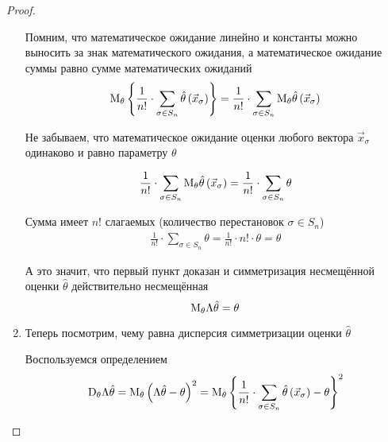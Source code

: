 \begin{proof}
\begin{enumerate}
            Помним, что математическое ожидание линейно и
            константы можно выносить за знак математического ожидания,
            а математическое ожидание суммы равно сумме математических ожиданий
            \begin{align*}
                \mathrm{M}_{\theta} \left\{\frac{1}{n!}\cdot\sum_{\sigma\in S_n}
                    \hat{\theta}\left(\vec{x}_\sigma\right)\right\}
                    =\frac{1}{n!}\cdot\sum_{\sigma\in S_n}
                        \mathrm{M}_{\theta} \hat{\theta}\left(\vec{x}_\sigma\right)
            \end{align*}

            Не забываем, что математическое ожидание оценки
            любого вектора $\vec{x}_\sigma$ одинаково и равно параметру $\theta$

            \begin{align*}
                \frac{1}{n!}\cdot\sum_{\sigma\in S_n}
                    \mathrm{M}_{\theta} \hat{\theta}\left(\vec{x}_\sigma\right)
                    =\frac{1}{n!}\cdot\sum_{\sigma\in S_n}\theta
            \end{align*}

            Сумма имеет $n!$ слагаемых (количество перестановок $\sigma\in S_n$)
            \begin{align*}
                \frac{1}{n!}\cdot\sum_{\sigma\in S_n}\theta
                    =\frac{1}{n!}\cdot n!\cdot\theta
                    =\theta
            \end{align*}

            А это значит, что первый пункт доказан и симметризация
            несмещённой оценки $\hat{\theta}$ действительно несмещённая
            $$\mathrm{M}_{\theta} \Lambda\hat{\theta}=\theta$$
        \item
            Теперь посмотрим, чему равна дисперсия симметризации
            оценки $\hat{\theta}$

            Воспользуемся определением
            \begin{align*}
                \mathrm{D}_{\theta} \Lambda\hat{\theta}
                    =\mathrm{M}_{\theta} 
                        \left(\Lambda\hat{\theta}-\theta\right)^2
                    =\mathrm{M}_{\theta} 
                        \left\{\frac{1}{n!}\cdot\sum_{\sigma\in S_n}
                            \hat{\theta}\left(\vec{x}_\sigma\right)
                            -\theta\right\}^2
            \end{align*}


\end{enumerate}
\end{proof}
